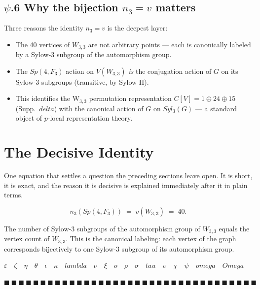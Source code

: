 \documentclass[12pt,a4paper]{article}
\def\mathbb#1{#1}%
\def\mathrm#1{#1}%
\def\mathbf#1{#1}%
\def\omega{omega}%
\def\delta{delta}%
\def\lambda{lambda}%
\def\tau{tau}%
\def\Omega{Omega}%
\theoremstyle{definition}
\newcommand{\Sp}{\mathrm{Sp}}
\newcommand{\FF}{\mathbb{F}}
\newcommand{\CC}{\mathbb{C}}
\begin{document}
\subsection*{$\psi$.6 \quad Why the bijection $n_3 = v$ matters}
Three reasons the identity $n_3 = v$ is the deepest layer:
\begin{itemize}[leftmargin=2em,nosep]
\item The 40 vertices of $W_{3,3}$ are not arbitrary points — each is
canonically labeled by a Sylow-3 subgroup of the automorphism group.
\item The $\Sp(4,\FF_3)$ action on $V(W_{3,3})$ \emph{is} the
conjugation action of $G$ on its Sylow-3 subgroups (transitive, by
Sylow II).
\item This identifies the W$_{3,3}$ permutation representation
$\CC[V] = \mathbf{1}\oplus\mathbf{24}\oplus\mathbf{15}$
(Supp.~$\delta$) with the canonical action of $G$ on $\mathrm{Syl}_3(G)$
— a standard object of $p$-local representation theory.
\end{itemize}

\section*{The Decisive Identity}

\begin{plainbox}
One equation that settles a question the preceding sections leave open. It is short,
it is exact, and the reason it is decisive is explained immediately after it in plain
terms.
\end{plainbox}


\[
\boxed{\;n_3(\Sp(4,\FF_3)) \;=\; v(W_{3,3}) \;=\; 40.\;}
\]

The number of Sylow-3 subgroups of the automorphism group of $W_{3,3}$
equals the vertex count of $W_{3,3}$. This is the canonical
labeling: each vertex of the graph corresponds bijectively to one
Sylow-3 subgroup of its automorphism group.

\hfill$\varepsilon\quad\zeta\quad\eta\quad\theta\quad\iota\quad\kappa\quad\lambda\quad\nu\quad\xi\quad o\quad\rho\quad\sigma\quad\tau\quad\upsilon\quad\chi\quad\psi\quad\omega\quad\Omega$

\hfill $\blacksquare\ \blacksquare\ \blacksquare\ \blacksquare\ \blacksquare\ \blacksquare\ \blacksquare\ \blacksquare\ \blacksquare\ \blacksquare\ \blacksquare\ \blacksquare\ \blacksquare\ \blacksquare\ \blacksquare\ \blacksquare\ \blacksquare\ \blacksquare\ \blacksquare\ \blacksquare\ \blacksquare\ \blacksquare\ \blacksquare\ \blacksquare\ \blacksquare\ \blacksquare\ \blacksquare\ \blacksquare\ \blacksquare\ \blacksquare\ \blacksquare\ \blacksquare\ \blacksquare\ \blacksquare\ \blacksquare$
\end{document}
